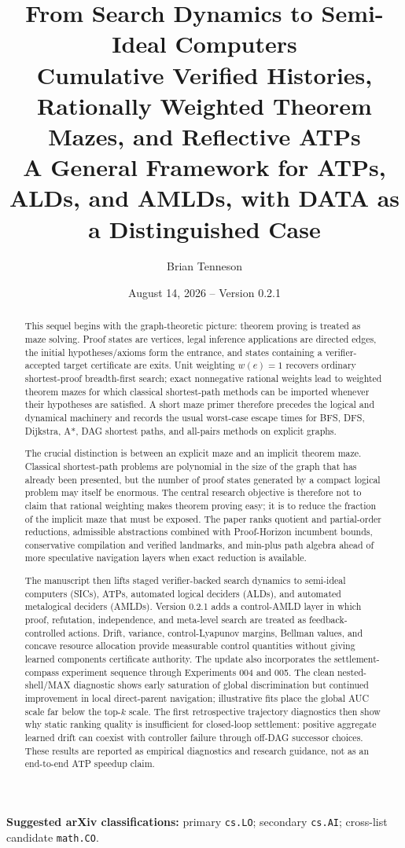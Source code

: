 \documentclass[11pt]{article}
\title{\textbf{From Search Dynamics to Semi-Ideal Computers}\\[0.4em]
\Large Cumulative Verified Histories, Rationally Weighted Theorem Mazes, and Reflective ATPs\\[0.6em]
\large A General Framework for ATPs, ALDs, and AMLDs, with DATA as a Distinguished Case}
\author{Brian Tenneson}
\date{August 14, 2026 -- Version 0.2.1}
\theoremstyle{remark}
\begin{document}
\maketitle

\begin{center}
\textbf{Suggested arXiv classifications:} primary \texttt{cs.LO}; secondary \texttt{cs.AI}; cross-list candidate \texttt{math.CO}.
\end{center}

\begin{abstract}
This sequel begins with the graph-theoretic picture: theorem proving is treated as maze solving. Proof states are vertices, legal inference applications are directed edges, the initial hypotheses/axioms form the entrance, and states containing a verifier-accepted target certificate are exits. Unit weighting $w(e)=1$ recovers ordinary shortest-proof breadth-first search; exact nonnegative rational weights lead to weighted theorem mazes for which classical shortest-path methods can be imported whenever their hypotheses are satisfied. A short maze primer therefore precedes the logical and dynamical machinery and records the usual worst-case escape times for BFS, DFS, Dijkstra, A*, DAG shortest paths, and all-pairs methods on explicit graphs.

The crucial distinction is between an explicit maze and an implicit theorem maze. Classical shortest-path problems are polynomial in the size of the graph that has already been presented, but the number of proof states generated by a compact logical problem may itself be enormous. The central research objective is therefore not to claim that rational weighting makes theorem proving easy; it is to reduce the fraction of the implicit maze that must be exposed. The paper ranks quotient and partial-order reductions, admissible abstractions combined with Proof-Horizon incumbent bounds, conservative compilation and verified landmarks, and min-plus path algebra ahead of more speculative navigation layers when exact reduction is available.

The manuscript then lifts staged verifier-backed search dynamics to semi-ideal computers (SICs), ATPs, automated logical deciders (ALDs), and automated metalogical deciders (AMLDs). Version 0.2.1 adds a control-AMLD layer in which proof, refutation, independence, and meta-level search are treated as feedback-controlled actions. Drift, variance, control-Lyapunov margins, Bellman values, and concave resource allocation provide measurable control quantities without giving learned components certificate authority. The update also incorporates the settlement-compass experiment sequence through Experiments 004 and 005. The clean nested-shell/MAX diagnostic shows early saturation of global discrimination but continued improvement in local direct-parent navigation; illustrative fits place the global AUC scale far below the top-$k$ scale. The first retrospective trajectory diagnostics then show why static ranking quality is insufficient for closed-loop settlement: positive aggregate learned drift can coexist with controller failure through off-DAG successor choices. These results are reported as empirical diagnostics and research guidance, not as an end-to-end ATP speedup claim.


\end{abstract}
\end{document}
